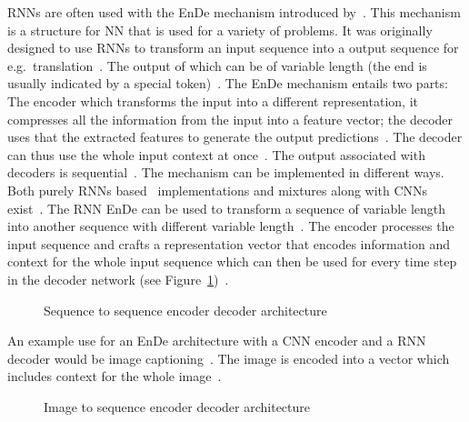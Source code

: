 \acp{RNN} are often used with the \ac{EnDe} mechanism introduced by~\cite{cho_learning_2014}.
This mechanism is a structure for \ac{NN} that is used for a variety of problems.
It was originally designed to use \acp{RNN} to transform an input sequence into a output sequence
for e.g.~translation~\citep{cho_learning_2014}.
The output of which can be of variable length (the end is usually indicated by a special
token)~\citep{cho_learning_2014,asadi_encoder-decoder_2020}.
The \ac{EnDe} mechanism entails two parts: The encoder which transforms the input into a
different representation, it compresses all the information from the input into a feature vector;
the decoder uses that the extracted features to generate the output
predictions~\citep{asadi_encoder-decoder_2020,cho_learning_2014}.
The decoder can thus use the whole input context at once~\citep{asadi_encoder-decoder_2020}.
The output associated with decoders is sequential~\citep{asadi_encoder-decoder_2020}.
The mechanism can be implemented in different ways.
Both purely \acp{RNN} based~\citep{cho_learning_2014} implementations and mixtures along with
\acp{CNN}~\citep{ghosh_visual_2017} exist~\citep{asadi_encoder-decoder_2020}.
The \ac{RNN} \ac{EnDe} can be used to transform a sequence of variable length into another
sequence with different variable length~\citep{cho_learning_2014}.
The encoder processes the input sequence and crafts a representation vector that encodes information
and context for the whole input sequence which can then be used for every time step in the decoder
network (see Figure~\ref{fig:enc-dec-rnn})~\citep{cho_learning_2014}.
\begin{figure}[h]
    \centering
    \caption[Sequence to sequence encoder decoder architecture]{%
        Sequence to sequence encoder decoder
        architecture~\citep{cho_learning_2014}\label{fig:enc-dec-rnn}
    }
\end{figure}
An example use for an \ac{EnDe} architecture with a \ac{CNN} encoder and a \ac{RNN} decoder
would be image captioning~\citep{asadi_encoder-decoder_2020}.
The image is encoded into a vector which includes context for the whole
image~\citep{asadi_encoder-decoder_2020}.
\begin{figure}[h]
    \centering
    \caption[Image to sequence encoder decoder architecture]{%
        Image to sequence encoder decoder
        architecture~\citep{asadi_encoder-decoder_2020}\label{fig:enc-dec-cnn}
    }
\end{figure}

